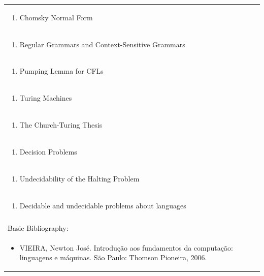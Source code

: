 \documentclass[11pt]{article}
\begin{document}
\begin{center}
\begin{longtable}{|p{4cm}|p{4cm}|p{4cm}|p{4cm}|}
\multicolumn{4}{|p{\dimexpr 16cm + 6\tabcolsep\relax}|}{\begin{enumerate}[start=11]\item Chomsky Normal Form\end{enumerate}}\\
\multicolumn{4}{|p{\dimexpr 16cm + 6\tabcolsep\relax}|}{\begin{enumerate}[start=12]\item Regular Grammars and Context-Sensitive Grammars\end{enumerate}}\\
\multicolumn{4}{|p{\dimexpr 16cm + 6\tabcolsep\relax}|}{\begin{enumerate}[start=13]\item Pumping Lemma for CFLs\end{enumerate}}\\
\multicolumn{4}{|p{\dimexpr 16cm + 6\tabcolsep\relax}|}{\begin{enumerate}[start=14]\item Turing Machines\end{enumerate}}\\
\multicolumn{4}{|p{\dimexpr 16cm + 6\tabcolsep\relax}|}{\begin{enumerate}[start=15]\item The Church-Turing Thesis\end{enumerate}}\\
\multicolumn{4}{|p{\dimexpr 16cm + 6\tabcolsep\relax}|}{\begin{enumerate}[start=16]\item Decision Problems\end{enumerate}}\\
\multicolumn{4}{|p{\dimexpr 16cm + 6\tabcolsep\relax}|}{\begin{enumerate}[start=17]\item Undecidability of the Halting Problem\end{enumerate}}\\
\multicolumn{4}{|p{\dimexpr 16cm + 6\tabcolsep\relax}|}{\begin{enumerate}[start=18]\item Decidable and undecidable problems about languages\end{enumerate}}\\
\multicolumn{4}{|p{\dimexpr 16cm + 6\tabcolsep\relax}|}{}\\
\hline
\multicolumn{4}{|p{16cm}|}{Basic Bibliography:}\\*
\multicolumn{4}{|p{\dimexpr 16cm + 6\tabcolsep\relax}|}{\begin{itemize}\item VIEIRA, Newton José. Introdução aos fundamentos da computação: linguagens e máquinas. São Paulo: Thomson Pioneira, 2006.\end{itemize}}\\

\end{longtable}
\end{center}
\end{document}
